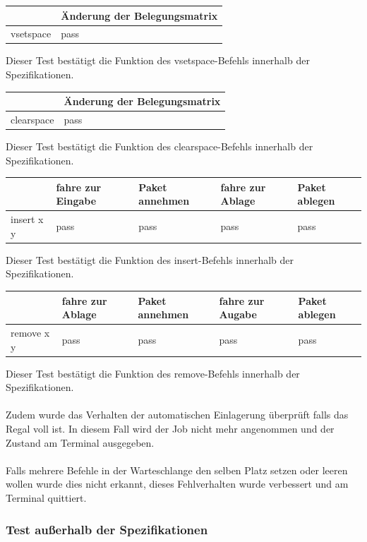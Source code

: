 \begin{tabular}{|l|l|}
\hline
         	& Änderung der Belegungsmatrix\\
\hline
vsetspace & pass\\
\hline
\end{tabular}

Dieser Test bestätigt die Funktion des vsetspace-Befehls innerhalb der Spezifikationen.
\newline

\begin{tabular}{|l|l|}
\hline
         	& Änderung der Belegungsmatrix\\
\hline
clearspace & pass\\
\hline
\end{tabular}

Dieser Test bestätigt die Funktion des clearspace-Befehls innerhalb der Spezifikationen.



\begin{tabular}{|l|l|l|l|l|}
\hline
         	&  fahre zur Eingabe & Paket annehmen   & fahre zur Ablage & Paket ablegen\\
\hline
insert x y & pass & pass & pass & pass\\
\hline
\end{tabular}

Dieser Test bestätigt die Funktion des insert-Befehls innerhalb der Spezifikationen.


\begin{tabular}{|l|l|l|l|l|}
\hline
         	&  fahre zur Ablage & Paket annehmen   & fahre zur Augabe & Paket ablegen\\
\hline
remove x y & pass & pass & pass & pass\\
\hline
\end{tabular}

Dieser Test bestätigt die Funktion des remove-Befehls innerhalb der Spezifikationen.\\
\\
Zudem wurde das Verhalten der automatischen Einlagerung überprüft falls das Regal voll ist. In diesem Fall wird der Job nicht mehr angenommen und der Zustand am Terminal ausgegeben.\\
\\
Falls mehrere Befehle in der Warteschlange den selben Platz setzen oder leeren wollen wurde dies nicht erkannt, dieses Fehlverhalten wurde verbessert  und am Terminal quittiert.


\subsubsection {Test außerhalb der Spezifikationen}

